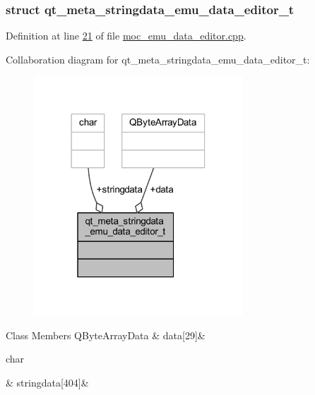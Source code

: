 \subsubsection{struct qt\+\_\+meta\+\_\+stringdata\+\_\+emu\+\_\+data\+\_\+editor\+\_\+t}


Definition at line \hyperlink{a00014_source_l00021}{21} of file \hyperlink{a00014_source}{moc\+\_\+emu\+\_\+data\+\_\+editor.\+cpp}.



Collaboration diagram for qt\+\_\+meta\+\_\+stringdata\+\_\+emu\+\_\+data\+\_\+editor\+\_\+t\+:
\nopagebreak
\begin{figure}[H]
\begin{center}
\leavevmode
\includegraphics[width=222pt]{db/d44/a00162}
\end{center}
\end{figure}
\begin{DoxyFields}{Class Members}
\hypertarget{a00014_a91db052cb5a1fcce8e53e81902e8e90b}{Q\+Byte\+Array\+Data}\label{a00014_a91db052cb5a1fcce8e53e81902e8e90b}
&
data\mbox{[}29\mbox{]}&
\\
\hline

\hypertarget{a00014_ae988ab8add535bff49a0c5d5ec714851}{char}\label{a00014_ae988ab8add535bff49a0c5d5ec714851}
&
stringdata\mbox{[}404\mbox{]}&
\\
\hline

\end{DoxyFields}


